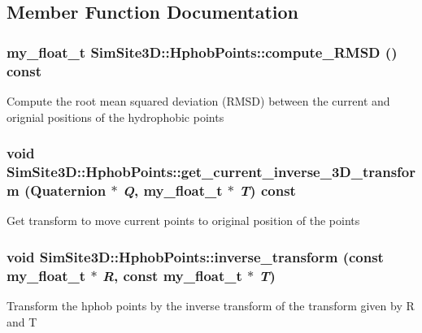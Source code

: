 \subsection{Member Function Documentation}
\subsubsection{\setlength{\rightskip}{0pt plus 5cm}my\_\-float\_\-t SimSite3D::Hphob\-Points::compute\_\-RMSD () const\hspace{0.3cm}{\tt  [inline]}}\label{classSimSite3D_1_1HphobPoints_747fff02a3a0463f032470212a50e9e6}


Compute the root mean squared deviation (RMSD) between the current and orignial positions of the hydrophobic points 
\subsubsection{\setlength{\rightskip}{0pt plus 5cm}void SimSite3D::Hphob\-Points::get\_\-current\_\-inverse\_\-3D\_\-transform (Quaternion $\ast$ {\em Q}, my\_\-float\_\-t $\ast$ {\em T}) const\hspace{0.3cm}{\tt  [inline]}}\label{classSimSite3D_1_1HphobPoints_130111b0a5617851d7ffde3387c48b80}


Get transform to move current points to original position of the points 
\subsubsection{\setlength{\rightskip}{0pt plus 5cm}void SimSite3D::Hphob\-Points::inverse\_\-transform (const my\_\-float\_\-t $\ast$ {\em R}, const my\_\-float\_\-t $\ast$ {\em T})\hspace{0.3cm}{\tt  [inline]}}\label{classSimSite3D_1_1HphobPoints_116528abe8dfc536c786ac885e87dc02}


Transform the hphob points by the inverse transform of the transform given by R and T 
